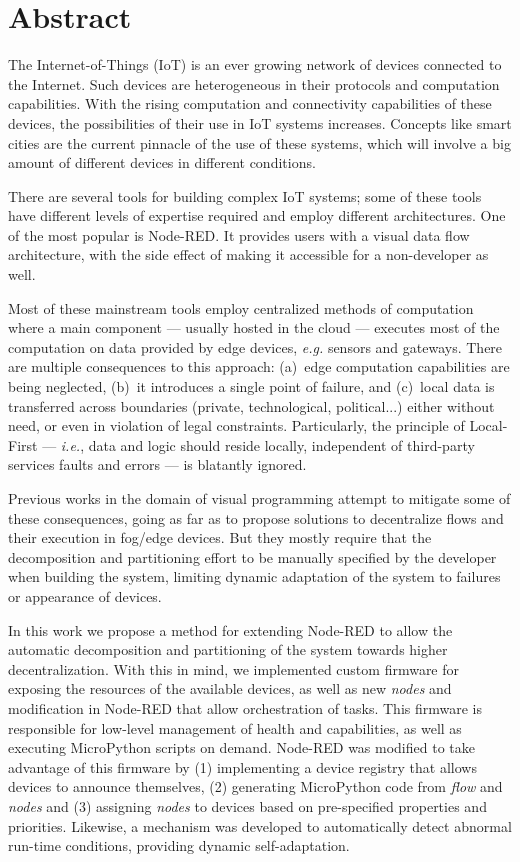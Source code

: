 \chapter*{Abstract}

The Internet-of-Things (IoT) is an ever growing network of devices connected to the Internet. Such devices are heterogeneous in their protocols and computation capabilities. With the rising computation and connectivity capabilities of these devices, the possibilities of their use in IoT systems increases. Concepts like smart cities are the current pinnacle of the use of these systems, which will involve a big amount of different devices in different conditions.

There are several tools for building complex IoT systems; some of these tools have different levels of expertise required and employ different architectures. One of the most popular is Node-RED. It provides users with a visual data flow architecture, with the side effect of making it accessible for a non-developer as well.

Most of these mainstream tools employ centralized methods of computation where a main component --- usually hosted in the cloud --- executes most of the computation on data provided by edge devices, \emph{e.g.} sensors and gateways. There are multiple consequences to this approach: (a)~edge computation capabilities are being neglected, (b)~it introduces a single point of failure, and (c)~local data is transferred across boundaries (private, technological, political...) either without need, or even in violation of legal constraints. Particularly, the principle of Local-First --- \emph{i.e.}, data and logic should reside locally, independent of third-party services faults and errors --- is blatantly ignored.

Previous works in the domain of visual programming attempt to mitigate some of these consequences, going as far as to propose solutions to decentralize flows and their execution in fog/edge devices. But they mostly require that the decomposition and partitioning effort to be manually specified by the developer when building the system, limiting dynamic adaptation of the system to failures or appearance of devices.

In this work we propose a method for extending Node-RED to allow the automatic decomposition and partitioning of the system towards higher decentralization. With this in mind, we implemented custom firmware for exposing the resources of the available devices, as well as new \textit{nodes} and modification in Node-RED that allow orchestration of tasks. This firmware is responsible for low-level management of health and capabilities, as well as executing MicroPython scripts on demand. Node-RED was modified to take advantage of this firmware by (1) implementing a device registry that allows devices to announce themselves, (2) generating MicroPython code from \textit{flow} and \textit{nodes} and (3) assigning \textit{nodes} to devices based on pre-specified properties and priorities. Likewise, a mechanism was developed to automatically detect abnormal run-time conditions, providing dynamic self-adaptation.

